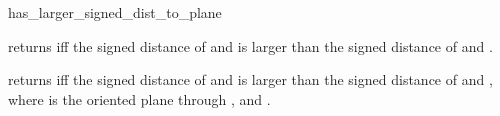 \begin{ccRefFunction}{has_larger_signed_dist_to_plane}

          {returns  iff the signed distance of 
           and  is larger than the signed distance of 
            and .}

          {returns  iff the signed distance of 
           and  is larger than the signed distance of 
            and , where  is the oriented
           plane through ,  and .}
\end{ccRefFunction}

